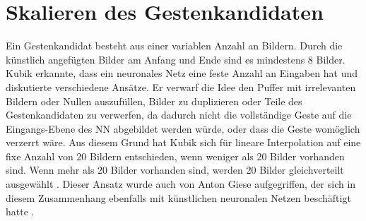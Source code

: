 \section{Skalieren des Gestenkandidaten}
\label{sec:scaling}
Ein Gestenkandidat besteht aus einer variablen Anzahl an Bildern. Durch die künstlich angefügten Bilder am Anfang und Ende sind es mindestens 8 Bilder. Kubik erkannte, dass ein neuronales Netz eine feste Anzahl an
Eingaben hat und diskutierte verschiedene Ansätze.
\newline
\newline
Er verwarf die Idee den Puffer mit irrelevanten Bildern oder Nullen auszufüllen, Bilder zu duplizieren oder Teile des Gestenkandidaten zu verwerfen, da dadurch
nicht die vollständige Geste auf die Eingangs-Ebene des NN abgebildet werden würde, oder dass die Geste womöglich verzerrt wäre.
\newline
\newline
Aus diesem Grund hat Kubik sich für lineare Interpolation auf eine fixe Anzahl von 20 Bildern entschieden, wenn weniger als 20 Bilder vorhanden sind. Wenn mehr als 20 Bilder vorhanden sind,
werden 20 Bilder gleichverteilt ausgewählt \cite{kubikThesis}. Dieser Ansatz wurde auch von Anton Giese aufgegriffen, der sich in diesem Zusammenhang ebenfalls mit künstlichen neuronalen Netzen
beschäftigt hatte \cite{gieseThesis}.